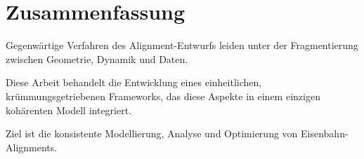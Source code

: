 

\section{Zusammenfassung}

\begin{summary}
Gegenwärtige Verfahren des Alignment-Entwurfs leiden unter der Fragmentierung
zwischen Geometrie, Dynamik und Daten.

Diese Arbeit behandelt die Entwicklung eines einheitlichen,
krümmungsgetriebenen Frameworks, das diese Aspekte in einem einzigen
kohärenten Modell integriert.

Ziel ist die konsistente Modellierung, Analyse und Optimierung von
Eisenbahn-Alignments.
\end{summary}
